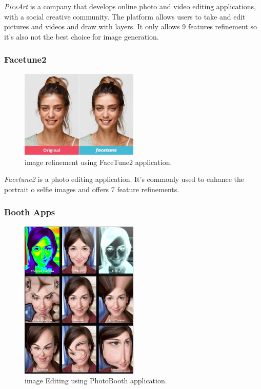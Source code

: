 \emph{PicsArt} is a company that develops online photo and video editing applications, with a social creative community. The platform allows users to take and edit pictures and videos and draw with layers. It only allows 9 features refinement so it's also not the best choice for image generation.

\subsubsection{Facetune2}

\begin{figure}[H]
    \centering
    \includegraphics[width=0.5\textwidth]{images/FaceTune.jpg}
    \caption{image refinement using FaceTune2 application.}
    \label{fig:FaceTune2}
\end{figure}

\emph{Facetune2} is a photo editing application. It's commonly used to enhance the portrait o selfie images and offers 7 feature refinements.

\subsubsection{Booth Apps}

\begin{figure}[H]
    \centering
    \includegraphics[width=0.5\textwidth]{images/photoBooth.png}
    \caption{image Editing using PhotoBooth application.}
    \label{fig:photoBooth}
\end{figure}

